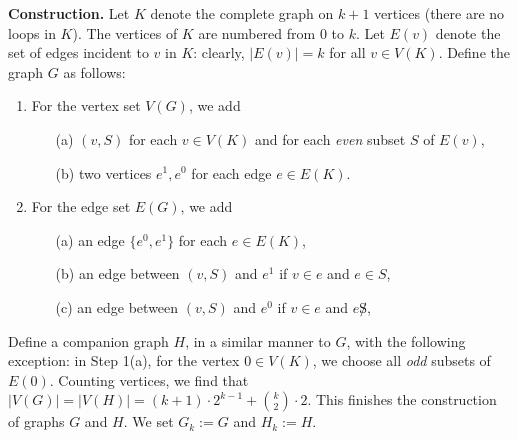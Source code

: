 \documentclass{article}
\newcommand{\xhdr}[1]{{\noindent\bfseries #1}}
\theoremstyle{definition}
\begin{document}
\xhdr{Construction.} Let $K$ denote the complete graph on $k+1$ vertices (there are no loops in $K$). The vertices of $K$ are numbered from $0$ to $k$. Let $E(v)$ denote the set of edges incident to $v$ in $K$: clearly, $|E(v)| = k$ for all $v \in V(K)$. Define the graph $G$ as follows:
\begin{enumerate}
	\item For the vertex set $V(G)$, we add   
	\begin{enumerate}
		\item[(a)] $(v,S)$ for each $v \in V(K)$ and for each \emph{even} subset $S$ of $E(v)$, 
		\item[(b)] two vertices $e^1,e^0$ for each edge $e \in E(K)$.  
	\end{enumerate} 
	\item For the edge set $E(G)$, we add 
	\begin{enumerate}
		\item[(a)] an edge $\{e^0,e^1\}$ for each $e \in E(K)$, 
		\item[(b)] an edge between $(v,S)$ and $e^1$ if $v \in e$ and $e \in S$,  
		\item[(c)] an edge between $(v,S)$ and $e^0$ if $v \in e$ and $e \not S$,  
	\end{enumerate} 
\end{enumerate} 
Define a companion graph $H$, in a similar manner to $G$, with the following exception: in Step 1(a), for the vertex $0 \in V(K)$, we choose all \emph{odd} subsets of $E(0)$. Counting vertices, we find that $|V(G)| = |V(H)| = (k+1)\cdot 2^{k-1} + {k \choose 2} \cdot 2$. This finishes the construction of graphs $G$ and $H$. We set $G_k := G$ and $H_k := H$. 
\end{document}

